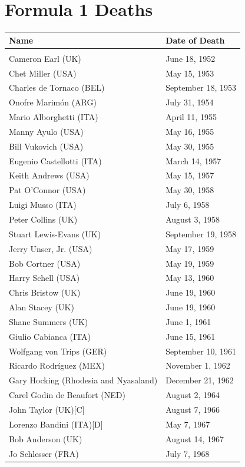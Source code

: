 \documentclass[12pt]{article} %
\begin{document}
\section{Formula 1 Deaths}
\begin{center}
\begin{longtable}{p{8cm} p{4cm}}
Name & Date of Death \\
\hline \\
Cameron Earl (UK)&June 18, 1952 \\
 Chet Miller (USA)&May 15, 1953\\
 Charles de Tornaco (BEL)&September 18, 1953\\
 Onofre Marimón (ARG)&July 31, 1954\\
 Mario Alborghetti (ITA)&April 11, 1955\\
 Manny Ayulo (USA)&May 16, 1955\\
 Bill Vukovich (USA)&May 30, 1955\\
 Eugenio Castellotti (ITA)&March 14, 1957\\
 Keith Andrews (USA)&May 15, 1957\\
 Pat O'Connor (USA)&May 30, 1958\\
 Luigi Musso (ITA)&July 6, 1958\\
 Peter Collins (UK)&August 3, 1958\\
 Stuart Lewis-Evans (UK)&September 19, 1958\\
 Jerry Unser, Jr. (USA)&May 17, 1959\\
 Bob Cortner (USA)&May 19, 1959\\
 Harry Schell (USA)&May 13, 1960\\
 Chris Bristow (UK)&June 19, 1960\\
 Alan Stacey (UK)&June 19, 1960\\
 Shane Summers (UK)&June 1, 1961\\
 Giulio Cabianca (ITA)&June 15, 1961\\
 Wolfgang von Trips (GER)&September 10, 1961\\
 Ricardo Rodríguez (MEX)&November 1, 1962\\
 Gary Hocking (Rhodesia and Nyasaland)&December 21, 1962\\
 Carel Godin de Beaufort (NED)&August 2, 1964\\
 John Taylor (UK)[C]&August 7, 1966\\
 Lorenzo Bandini (ITA)[D]&May 7, 1967\\
 Bob Anderson (UK)&August 14, 1967\\
 Jo Schlesser (FRA)&July 7, 1968\\

\end{longtable}
\end{center}
\end{document}
